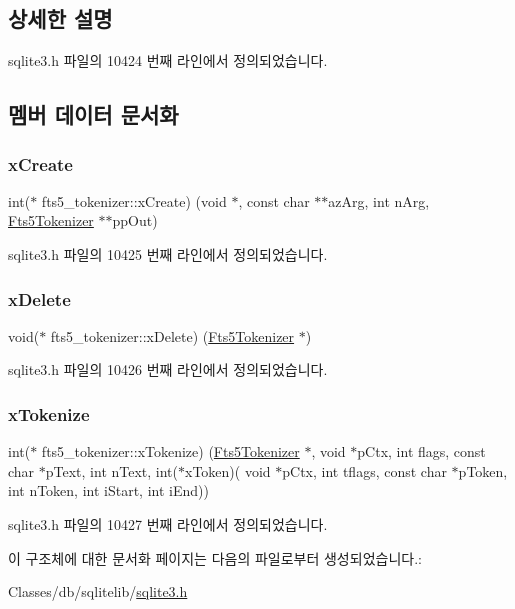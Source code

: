\subsection{상세한 설명}


sqlite3.\+h 파일의 10424 번째 라인에서 정의되었습니다.



\subsection{멤버 데이터 문서화}
\mbox{\label{structfts5__tokenizer_a61846ad000b2d38a1264c342c8201d5c}} 
\subsubsection{\texorpdfstring{x\+Create}{xCreate}}
{\footnotesize\ttfamily int($\ast$ fts5\+\_\+tokenizer\+::x\+Create) (void $\ast$, const char $\ast$$\ast$az\+Arg, int n\+Arg, \hyperlink{sqlite3_8h_ac015f88c5332d612a3125fc0014e468c}{Fts5\+Tokenizer} $\ast$$\ast$pp\+Out)}



sqlite3.\+h 파일의 10425 번째 라인에서 정의되었습니다.

\mbox{\label{structfts5__tokenizer_aaaa88b9f3e50f0b1120a05fb1bbb251f}} 
\subsubsection{\texorpdfstring{x\+Delete}{xDelete}}
{\footnotesize\ttfamily void($\ast$ fts5\+\_\+tokenizer\+::x\+Delete) (\hyperlink{sqlite3_8h_ac015f88c5332d612a3125fc0014e468c}{Fts5\+Tokenizer} $\ast$)}



sqlite3.\+h 파일의 10426 번째 라인에서 정의되었습니다.

\mbox{\label{structfts5__tokenizer_ae65ca5a9b1e6d5c1ef09731fccefa577}} 
\subsubsection{\texorpdfstring{x\+Tokenize}{xTokenize}}
{\footnotesize\ttfamily int($\ast$ fts5\+\_\+tokenizer\+::x\+Tokenize) (\hyperlink{sqlite3_8h_ac015f88c5332d612a3125fc0014e468c}{Fts5\+Tokenizer} $\ast$, void $\ast$p\+Ctx, int flags, const char $\ast$p\+Text, int n\+Text, int($\ast$x\+Token)( void $\ast$p\+Ctx, int tflags, const char $\ast$p\+Token, int n\+Token, int i\+Start, int i\+End))}



sqlite3.\+h 파일의 10427 번째 라인에서 정의되었습니다.



이 구조체에 대한 문서화 페이지는 다음의 파일로부터 생성되었습니다.\+:\begin{DoxyCompactItemize}
\item 
Classes/db/sqlitelib/\hyperlink{sqlite3_8h}{sqlite3.\+h}\end{DoxyCompactItemize}
